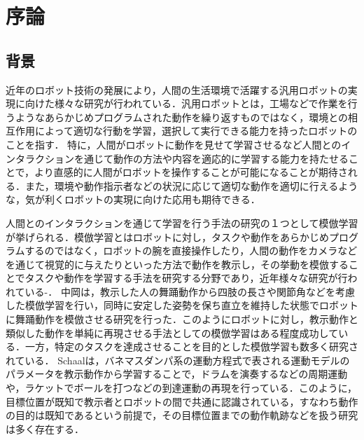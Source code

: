 ﻿%
\chapter{序論}

\section{背景}

近年のロボット技術の発展により，人間の生活環境で活躍する汎用ロボットの実現に向けた様々な研究が行われている．汎用ロボットとは，工場などで作業を行うようなあらかじめプログラムされた動作を繰り返すものではなく，環境との相互作用によって適切な行動を学習，選択して実行できる能力を持ったロボットのことを指す．
特に，人間がロボットに動作を見せて学習させるなど人間とのインタラクションを通じて動作の方法や内容を適応的に学習する能力を持たせることで，より直感的に人間がロボットを操作することが可能になることが期待される．また，環境や動作指示者などの状況に応じて適切な動作を適切に行えるような，気が利くロボットの実現に向けた応用も期待できる．

人間とのインタラクションを通じて学習を行う手法の研究の１つとして模倣学習が挙げられる．模倣学習とはロボットに対し，タスクや動作をあらかじめプログラムするのではなく，ロボットの腕を直接操作したり，人間の動作をカメラなどを通じて視覚的に与えたりといった方法で動作を教示し，その挙動を模倣することでタスクや動作を学習する手法を研究する分野であり，近年様々な研究が行われている\cite{imitation1}-\cite{imitation4}．
中岡\cite{nakaoka}は，教示した人の舞踊動作から四肢の長さや関節角などを考慮した模倣学習を行い，同時に安定した姿勢を保ち直立を維持した状態でロボットに舞踊動作を模倣させる研究を行った．このようにロボットに対し，教示動作と類似した動作を単純に再現させる手法としての模倣学習はある程度成功している．一方，特定のタスクを達成させることを目的とした模倣学習も数多く研究されている．
Schaal\cite{schaal}は，バネマスダンパ系の運動方程式で表される運動モデルのパラメータを教示動作から学習することで，ドラムを演奏するなどの周期運動や，ラケットでボールを打つなどの到達運動の再現を行っている．このように，目標位置が既知で教示者とロボットの間で共通に認識されている，すなわち動作の目的は既知であるという前提で，その目標位置までの動作軌跡などを扱う研究は多く存在する．

